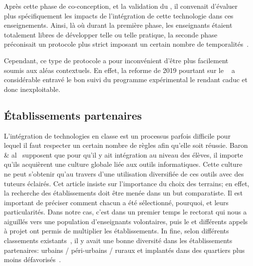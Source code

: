     Après cette phase de co-conception, et la validation du , il convenait d'évaluer plus spécifiquement les impacts de l'intégration de cette technologie dans ces enseignements. Ainsi, là où durant la première phase, les enseignants étaient totalement libres de développer telle ou telle pratique, la seconde phase préconisait un protocole plus strict imposant un certain nombre de temporalités~.\par%
    Cependant, ce type de protocole a pour inconvénient d'être plus facilement soumis aux aléas contextuels. En effet, la reforme de 2019 pourtant sur le ~ a considérable entravé le bon suivi du programme expérimental le rendant caduc et donc inexploitable. 
  \subsection{Établissements partenaires}\label{sec:etablisements}
    L'intégration de technologies en classe est un processus parfois difficile pour lequel il faut respecter un certain nombre de règles afin qu’elle soit réussie. Baron \& al~ supposent que pour qu’il y ait intégration au niveau des élèves, il importe qu’ils acquièrent une culture globale liée aux outils informatiques. Cette culture ne peut s’obtenir qu’au travers d’une utilisation diversifiée de ces outils avec des tuteurs éclairés. Cet article insiste sur l’importance du choix des terrains; en effet, la recherche des établissements doit être menée dans un but comparatiste. Il est important de préciser comment chacun a été sélectionné, pourquoi, et leurs particularités.
    Dans notre cas, c'est dans un premier temps le rectorat qui nous a aiguillés vers une population d'enseignants volontaires, puis le  et différents appels à projet ont permis de multiplier les établissements. In fine, selon différents classements existants~,  il y avait une bonne diversité dans les établissements partenaires: urbains / péri-urbains / ruraux et implantés dans des quartiers plus moins défavorisés~.
